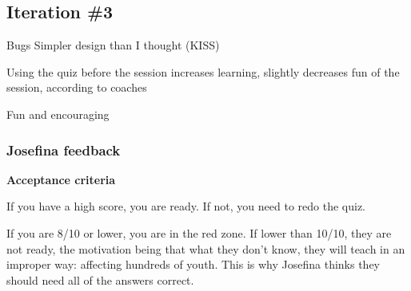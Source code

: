 \subsection{Iteration \#3}


  Bugs
  Simpler design than I thought (KISS)

  Using the quiz before the session increases learning, slightly decreases fun of the session, according to coaches

  Fun and encouraging

  \subsubsection{Josefina feedback}

  \textbf{Acceptance criteria}

If you have a high score, you are ready. If not, you need to redo the quiz.

If you are 8/10 or lower, you are in the red zone. If lower than 10/10, they are not ready, the motivation being that what they don't know, they will teach in an improper way: affecting hundreds of youth. This is why Josefina thinks they should need all of the answers correct.
